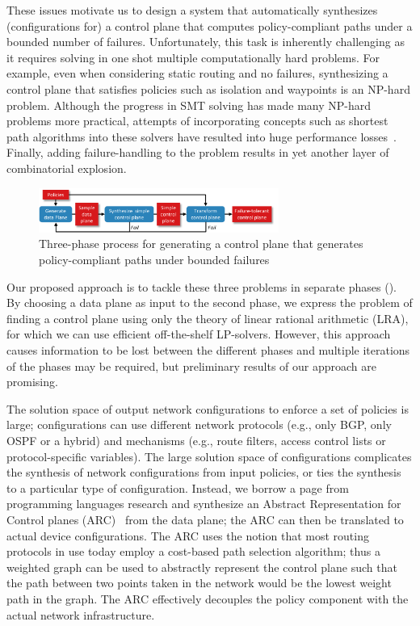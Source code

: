 These issues motivate us to design a system that automatically synthesizes
(configurations for) a control plane that computes policy-compliant paths
under a bounded number of failures.
Unfortunately, this task is inherently challenging as it requires solving in one shot multiple
computationally hard problems.
For example, even when considering static routing and no failures, synthesizing a control plane that satisfies  policies such as isolation and waypoints
is an NP-hard problem.
Although the progress in SMT solving has made many NP-hard problems more practical, 
 attempts of incorporating concepts such as shortest path algorithms 
into these solvers have resulted into huge performance losses~\cite{monosat}. 
Finally, adding failure-handling to the problem results in yet another layer of combinatorial explosion.

\begin{figure}
\centering
\includegraphics[width=0.7\textwidth]{figures/process.pdf}
\caption{Three-phase process for generating a control plane that generates
    policy-compliant paths under bounded failures}
\label{fig:process}
\end{figure}


Our proposed approach is to tackle these three problems in separate phases
().
By choosing a data plane as input to the second phase, we 
express the problem of finding a control plane using only the 
theory of linear rational arithmetic (LRA), for which we can use
efficient off-the-shelf LP-solvers. 
However, this approach causes information to be lost 
between the different phases
and multiple iterations of the phases may be required,
but preliminary results of our approach are promising.

The solution space of output network configurations to 
enforce a set of policies
is large; configurations can use different 
network protocols (e.g., only BGP, only OSPF or a hybrid) and
mechanisms (e.g., route filters, access control lists
or protocol-specific variables). The large solution space
of configurations complicates the synthesis of
network configurations from
input policies, 
or ties the synthesis to a particular type of configuration. 
Instead, we borrow a page from programming languages
research and
synthesize an Abstract Representation for Control planes (ARC)~\cite{arc} 
from the data plane; the ARC can then be translated to actual device configurations.
The ARC uses the notion that most routing protocols in use 
today employ a cost-based path selection algorithm; thus a weighted
graph can be used to abstractly represent the control plane such that 
the path between two points taken in the network would be 
the lowest weight path in the graph. 
The ARC effectively decouples the policy component with the 
actual network infrastructure. 

